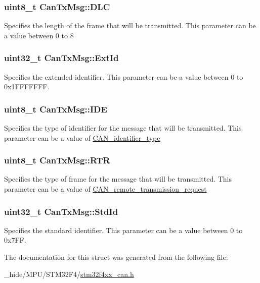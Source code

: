 \subsubsection[{D\+L\+C}]{\setlength{\rightskip}{0pt plus 5cm}uint8\+\_\+t Can\+Tx\+Msg\+::\+D\+L\+C}\label{struct_can_tx_msg_ab49d0fa602aad2fd9cd007adafc11fc2}
Specifies the length of the frame that will be transmitted. This parameter can be a value between 0 to 8 \hypertarget{struct_can_tx_msg_a33050a95a4cc463b589ff16bdd416f22}{}
\subsubsection[{Ext\+Id}]{\setlength{\rightskip}{0pt plus 5cm}uint32\+\_\+t Can\+Tx\+Msg\+::\+Ext\+Id}\label{struct_can_tx_msg_a33050a95a4cc463b589ff16bdd416f22}
Specifies the extended identifier. This parameter can be a value between 0 to 0x1\+F\+F\+F\+F\+F\+F\+F. \hypertarget{struct_can_tx_msg_aa4c8568a0e3250a17bd7e116b3e09670}{}
\subsubsection[{I\+D\+E}]{\setlength{\rightskip}{0pt plus 5cm}uint8\+\_\+t Can\+Tx\+Msg\+::\+I\+D\+E}\label{struct_can_tx_msg_aa4c8568a0e3250a17bd7e116b3e09670}
Specifies the type of identifier for the message that will be transmitted. This parameter can be a value of \hyperlink{group___c_a_n__identifier__type}{C\+A\+N\+\_\+identifier\+\_\+type} \hypertarget{struct_can_tx_msg_a69f84255db38c6910058f290efdb7302}{}
\subsubsection[{R\+T\+R}]{\setlength{\rightskip}{0pt plus 5cm}uint8\+\_\+t Can\+Tx\+Msg\+::\+R\+T\+R}\label{struct_can_tx_msg_a69f84255db38c6910058f290efdb7302}
Specifies the type of frame for the message that will be transmitted. This parameter can be a value of \hyperlink{group___c_a_n__remote__transmission__request}{C\+A\+N\+\_\+remote\+\_\+transmission\+\_\+request} \hypertarget{struct_can_tx_msg_abfb50c8208227f8cf378f29cf9a3a6f3}{}
\subsubsection[{Std\+Id}]{\setlength{\rightskip}{0pt plus 5cm}uint32\+\_\+t Can\+Tx\+Msg\+::\+Std\+Id}\label{struct_can_tx_msg_abfb50c8208227f8cf378f29cf9a3a6f3}
Specifies the standard identifier. This parameter can be a value between 0 to 0x7\+F\+F. 

The documentation for this struct was generated from the following file\+:\begin{DoxyCompactItemize}
\item 
\+\_\+hide/\+M\+P\+U/\+S\+T\+M32\+F4/\hyperlink{stm32f4xx__can_8h}{stm32f4xx\+\_\+can.\+h}\end{DoxyCompactItemize}
